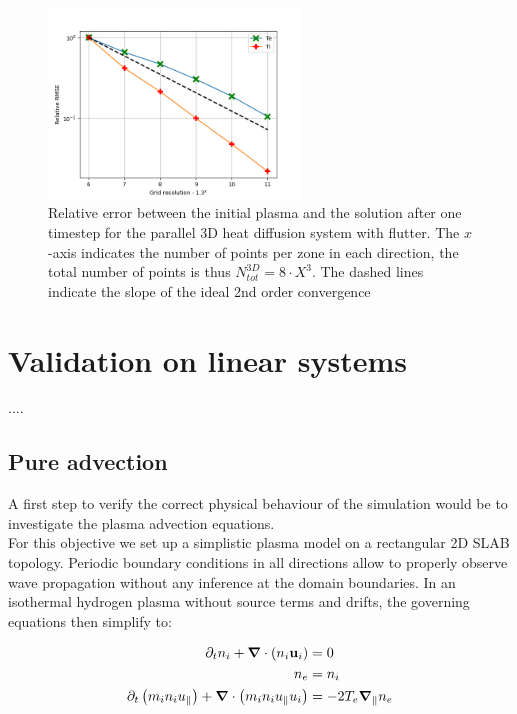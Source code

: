 \begin{figure}[H]
	\centering
	\includegraphics[width=0.6\textwidth]{schemes/err_rel_paradif_Brad_grid2_3D.png}
	\caption{Relative error between the initial plasma and the solution after one timestep for the parallel 3D heat diffusion system with flutter. The $x$-axis indicates the number of points per zone in each direction, the total number of points is thus $N_{tot}^{3D} = 8\cdot X^3$. The dashed lines indicate the slope of the ideal 2nd order convergence}
	\label{fig:MMSTorturedFlutterDiffParaConvergence}
\end{figure}




\section{Validation on linear systems}

.... 
\subsection{Pure advection}
A first step to verify the correct physical behaviour of the simulation would be to investigate the plasma advection equations. \\
For this objective we set up a simplistic plasma model on a rectangular 2D SLAB topology. Periodic boundary conditions in all directions allow to properly observe wave propagation without any inference at the domain boundaries. In an isothermal hydrogen plasma without source terms and drifts, the governing equations then simplify to:

\begin{align}
	\partial_t n_i + \grad\cdot\left(n_i\mathbf{u}_i\right) &= 0 \label{eq:AdvectionLinearAnalysis_ionMass} \\
	n_e &= n_i \label{eq:AdvectionLinearAnalysis_quasiNeutrality} \\
	\partial_t \left(m_in_iu_\parallel\right) + \grad\cdot\left(m_in_iu_\parallel u_i\right) &= -2T_e\grad_\parallel n_e \label{eq:AdvectionLinearAnalysis_parallelMomentumBalance}
\end{align}

